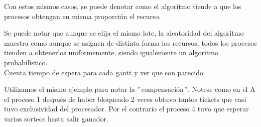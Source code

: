 Con estos mismos casos, se puede denotar como el algoritmo tiende a que los procesos obtengan en misma proporción el recurso.

Se puede notar que aunque se elija el mismo lote, la aleatoridad del algoritmo muestra como aunque se asignen de distinta forma los recursos, todos los procesos
tienden a obtenerlos uniformemente, siendo igualemente un algoritmo probabilìstico.\\

Cuenta tiempo de espera para cada gantt y ver que son parecido


Utilizamos el mismo ejemplo para notar la $"$compensación$"$. Notese como en el A el proceso 1 después de haber bloqueado 2 veces obtuvo tantos tickets que casi tuvo
exclusividad del procesador. Por el contrario el proceso 4 tuvo que esperar varios sorteos hasta salir ganador.
